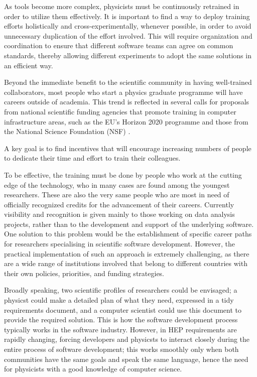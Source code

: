 \documentclass[12pt,a4paper]{article}
\begin{document}
As tools become more complex, physicists must be continuously retrained in order
to utilize them effectively. It is important to find a way to deploy training efforts
holistically and cross-experimentally, whenever possible, in order to avoid unnecessary 
duplication of the effort involved. This will require organization and coordination to
ensure that different software teams can agree on common standards, thereby allowing different
experiments to adopt the same solutions in an efficient way. 

Beyond the immediate benefit to the scientific community in having well-trained
collaborators, most people who start a physics graduate programme will have
careers outside of academia. This trend is reflected in several calls for
proposals from national scientific funding agencies that promote training in computer
infrastructure areas, such as the EU's Horizon 2020 programme and those from
the National Science Foundation (NSF) \cite{NSF1,NSF2}.

A key goal is to find incentives that will encourage 
increasing numbers of people to dedicate their time and effort to train their
colleagues.

To be effective, the training must be done by people who work at the cutting
edge of the technology, who in many cases are found among the youngest
researchers. These are also the very same people who are most in need of
officially recognized credits for the advancement of their careers. Currently
visibility and recognition is given mainly to those working on data analysis
projects, rather than to the development and support of the underlying
software. One solution to this problem would be the establishment of specific
career paths for researchers specialising in scientific software development. 
However, the practical 
implementation of such an approach is extremely challenging, as there are a wide range of
institutions involved that belong to different countries with their own
policies, priorities, and funding strategies. 

Broadly speaking, two scientific profiles of researchers could be
envisaged; a physicst could make a detailed plan of what they need, expressed 
in a tidy requirements document, and a computer scientist could use this document 
to provide the required solution. This is how the software development process 
typically works in the software industry. However, in HEP requirements are rapidly
changing, forcing developers and physicsts to interact closely during the entire
process of software development; this works smoothly only when both communities have the
same goals and speak the same language, hence the need for physicists with a good
knowledge of computer science.
\end{document}
